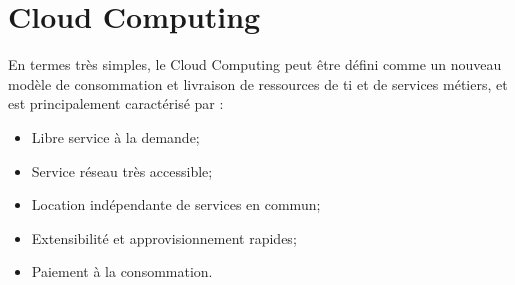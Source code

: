 




\section{Cloud Computing}
En termes très simples, le Cloud Computing peut être défini comme un nouveau modèle de consommation et livraison de ressources de \gls{ti} et de services métiers, et est principalement caractérisé par :
\begin{itemize}
\item Libre service à la demande;
\item Service réseau très accessible;
\item Location indépendante de services en commun;
\item Extensibilité et approvisionnement rapides;
\item Paiement à la consommation.
\end{itemize}


